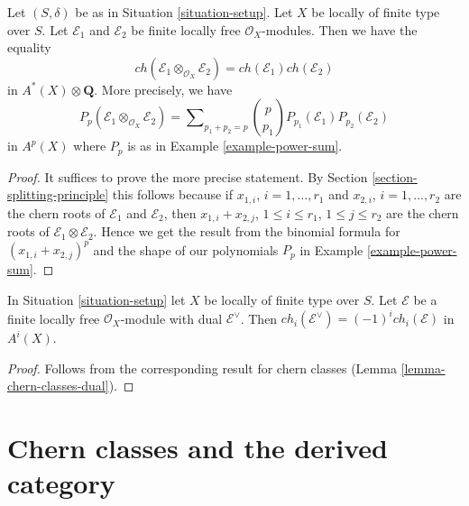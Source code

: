 \begin{lemma}
\label{lemma-chern-character-multiplicative}
Let $(S, \delta)$ be as in Situation \ref{situation-setup}. Let $X$ be locally
of finite type over $S$. Let $\mathcal{E}_1$ and $\mathcal{E}_2$
be finite locally free $\mathcal{O}_X$-modules.
Then we have the equality
$$
ch(\mathcal{E}_1 \otimes_{\mathcal{O}_X} \mathcal{E}_2) =
ch(\mathcal{E}_1) ch(\mathcal{E}_2)
$$
in $A^*(X) \otimes \mathbf{Q}$. More precisely, we have
$$
P_p(\mathcal{E}_1 \otimes_{\mathcal{O}_X} \mathcal{E}_2) =
\sum\nolimits_{p_1 + p_2 = p}
{p \choose p_1} P_{p_1}(\mathcal{E}_1) P_{p_2}(\mathcal{E}_2)
$$
in $A^p(X)$ where $P_p$ is as in Example \ref{example-power-sum}.
\end{lemma}

\begin{proof}
It suffices to prove the more precise statement. By
Section \ref{section-splitting-principle}
this follows because if $x_{1, i}$, $i = 1, \ldots, r_1$
and $x_{2, i}$, $i = 1, \ldots, r_2$ are the
chern roots of $\mathcal{E}_1$ and $\mathcal{E}_2$, then
$x_{1, i} + x_{2, j}$, $1 \leq i \leq r_1$, $1 \leq j \leq r_2$
are the chern roots of $\mathcal{E}_1 \otimes \mathcal{E}_2$.
Hence we get the result from the binomial formula for
$(x_{1, i} + x_{2, j})^p$ and the
shape of our polynomials $P_p$ in Example \ref{example-power-sum}.
\end{proof}

\begin{lemma}
\label{lemma-chern-character-dual}
In Situation \ref{situation-setup} let $X$ be locally of finite type over $S$.
Let $\mathcal{E}$ be a finite locally free $\mathcal{O}_X$-module
with dual $\mathcal{E}^\vee$. Then
$ch_i(\mathcal{E}^\vee) = (-1)^i ch_i(\mathcal{E})$ in $A^i(X)$.
\end{lemma}

\begin{proof}
Follows from the corresponding result for chern classes
(Lemma \ref{lemma-chern-classes-dual}).
\end{proof}











\section{Chern classes and the derived category}
\label{section-pre-derived}

